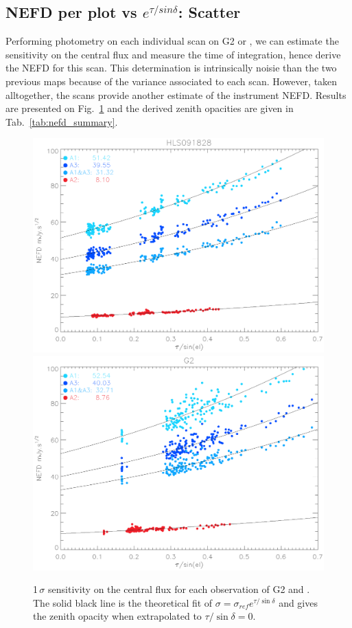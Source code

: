 \subsection{NEFD per plot vs $e^{\tau/sin\delta}$: Scatter}

Performing photometry on each individual scan on G2 or \hls, we can estimate the
sensitivity on the central flux and measure the time of integration, hence
derive the NEFD for this scan. This determination is intrinsically noisie than
the two previous maps because of the variance associated to each scan. However,
taken alltogether, the scans provide another estimate of the instrument
NEFD. Results are presented on Fig.~\ref{fig:nefd_scatter} and the derived
zenith opacities are given in Tab.~\ref{tab:nefd_summary}.

\begin{figure}[hhh]
\begin{center}
\includegraphics[clip, angle=0, scale =0.42]{Figures/hls_NEFD_vs_TauElev_all.eps}
\includegraphics[clip, angle=0, scale =0.42]{Figures/g2_NEFD_vs_TauElev_all.eps}
\caption[NEFD per scan]{1\,$\sigma$ sensitivity on the central flux for each
  observation of G2 and \hls. The solid black line is the theoretical fit of
  $\sigma = \sigma_{ref}e^{\tau/\sin\delta}$ and gives the zenith opacity when
  extrapolated to $\tau/\sin\delta = 0$.}
\label{fig:nefd_scatter}
\end{center}
\end{figure}

